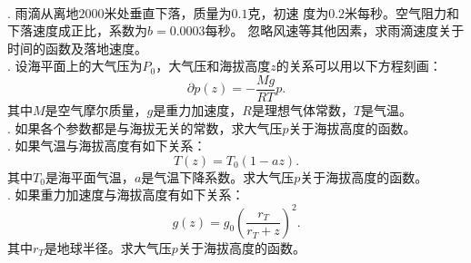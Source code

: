 \documentclass[12pt,UTF8,fontset=none]{ctexbook}
\begin{document}
\begin{et}
    \mbox{} \\
    . 雨滴从离地$2000$米处垂直下落，质量为$0.1$克，初速
    度为$0.2$米每秒。空气阻力和下落速度成正比，系数为$b=0.0003$每秒。
    忽略风速等其他因素，求雨滴速度关于时间的函数及落地速度。\\
    . 设海平面上的大气压为$P_0$，大气压和海拔高度$z$的关系可以用以下方程刻画：
    $$ \partial p(z) = -\frac{Mg}{RT} p. $$
    其中$M$是空气摩尔质量，$g$是重力加速度，$R$是理想气体常数，$T$是气温。\\
    . 如果各个参数都是与海拔无关的常数，求大气压$p$关于海拔高度的函数。\\
    . 如果气温与海拔高度有如下关系：
    $$ T(z) = T_0(1 - az).$$
    其中$T_0$是海平面气温，$a$是气温下降系数。求大气压$p$关于海拔高度的函数。\\
    . 如果重力加速度与海拔高度有如下关系：
    $$ g(z) = g_0 \left(\frac{r_T}{r_T + z}\right)^2. $$
    其中$r_T$是地球半径。求大气压$p$关于海拔高度的函数。

\end{et}
\end{document}
